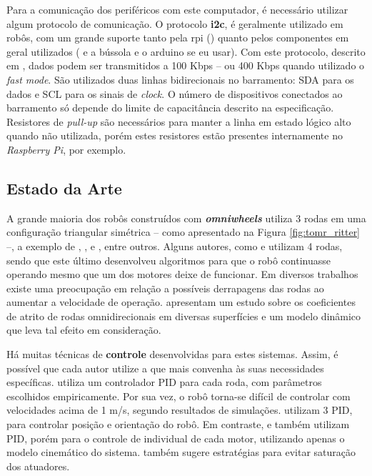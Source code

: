 
Para a comunicação dos periféricos com este computador, é necessário utilizar algum protocolo de comunicação. O protocolo \textbf{\acrlong{i2c}}, é geralmente utilizado em robôs, com um grande suporte tanto pela \acrshort{rpi} (\cite{upton2014raspberry}) quanto pelos componentes em geral utilizados (\cite{MPU6050} e a bússola e o arduino se eu usar). Com este protocolo, descrito em \cite{semiconductors2000i2c}, dados podem ser transmitidos a 100 Kbps -- ou 400 Kbps quando utilizado o \emph{fast mode}. São utilizados duas linhas bidirecionais no barramento: SDA para os dados e SCL para os sinais de \emph{clock}. O número de dispositivos conectados ao barramento só depende do limite de capacitância descrito na especificação. Resistores de \emph{pull-up} são necessários para manter a linha em estado lógico alto quando não utilizada, porém estes resistores estão presentes internamente no \emph{Raspberry Pi}, por exemplo.

\subsection{Estado da Arte}

A grande maioria dos robôs construídos com \textbf{\emph{omniwheels}} utiliza 3 rodas em uma configuração triangular simétrica -- como apresentado na Figura \ref{fig:tomr_ritter} --, a exemplo de \cite{ritter2016modelagem}, \cite{samani2007comprehensive}, \cite{williams2002dynamic} e \cite{indiveri2009swedish}, entre outros. Alguns autores, como \cite{krinkin2015design} e \cite{rojas2006holonomic} utilizam 4 rodas, sendo que este último desenvolveu algoritmos para que o robô continuasse operando mesmo que um dos motores deixe de funcionar. Em diversos trabalhos existe uma preocupação em relação a possíveis derrapagens das rodas ao aumentar a velocidade de operação. \cite{williams2002dynamic} apresentam um estudo sobre os coeficientes de atrito de rodas omnidirecionais em diversas superfícies e um modelo dinâmico que leva tal efeito em consideração.

Há muitas técnicas de \textbf{controle} desenvolvidas para estes sistemas. Assim, é possível que cada autor utilize a que mais convenha às suas necessidades específicas. \cite{ritter2016modelagem} utiliza um controlador PID para cada roda, com parâmetros escolhidos empiricamente. Por sua vez, o robô torna-se difícil de controlar com velocidades acima de 1 m/s, segundo resultados de simulações. \cite{samani2007comprehensive} utilizam 3 PID, para controlar posição e orientação do robô. Em contraste, \cite{rojas2006holonomic} e \cite{indiveri2009swedish} também utilizam PID, porém para o controle de individual de cada motor, utilizando apenas o modelo cinemático do sistema. \cite{indiveri2009swedish} também sugere estratégias para evitar saturação dos atuadores.

